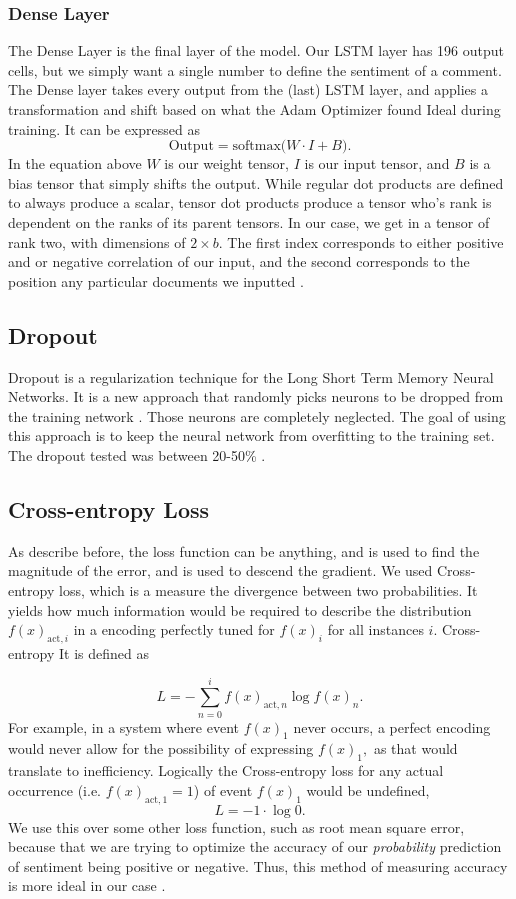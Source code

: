 \documentclass[titlepage,letterpaper]{article}
\begin{document}
\subsubsection{Dense Layer}
The Dense Layer is the final layer of the model. Our LSTM layer has 196 output cells, but we simply want a single number to define the sentiment of a comment.  The Dense layer takes every output from the (last) LSTM layer, and applies a transformation and shift based on what the Adam Optimizer found Ideal during training. It can be expressed as
\[ \text{Output} = \text{softmax(} W \cdot I + B ). \]
In the equation above \(W\) is our weight tensor, \(I\) is our input tensor, and \(B\) is a bias tensor that simply shifts the output. While regular dot products are defined to always produce a scalar, tensor dot products produce a tensor who's rank is dependent on the ranks of its parent tensors. In our case, we get in a tensor of rank two, with dimensions of \(2\times b.\) The first index corresponds to either positive and or negative correlation of our input, and the second corresponds to the position any particular documents we inputted \cite{tensors, tensorflow}.


\subsection{Dropout}
Dropout is a regularization technique for the Long Short Term Memory Neural Networks. It is a new approach that randomly picks neurons to be dropped from the training network \cite{NeuralNet}. Those neurons are completely neglected. The goal of using this approach is to keep the neural network from overfitting to the training set. The dropout tested was between 20-50\% \cite{NeuralNet}.


\subsection{Cross-entropy Loss} \label{loss-section}
As describe before, the loss function can be anything, and is used to find the magnitude of the error, and is used to descend the gradient. We used Cross-entropy loss, which is a measure the divergence between two probabilities. It yields how much information would be required to describe the distribution \(f(x)_{\text{act},i} \) in a encoding perfectly tuned for \(f(x)_i \) for all instances \(i\). Cross-entropy It is defined as \cite{NeuralNet}

\[L = -\sum_{n=0}^i f(x)_{\text{act},n} \log f(x)_n.\] 
For example, in a system where event \(f(x)_1\) never occurs, a perfect encoding would never allow for the possibility of expressing \(f(x)_1,\) as that would translate to inefficiency. Logically the Cross-entropy loss for any actual occurrence (i.e. \(f(x)_{\text{act},1}= 1\)) of  event \(f(x)_1\) would be undefined,
\[L = -1\cdot\log 0.\]
We use this over some other loss function, such as root mean square error, because that we are trying to optimize the accuracy of our \textit{probability} prediction of sentiment being positive or negative. Thus, this method of measuring accuracy is more ideal in our case . 
\end{document}
